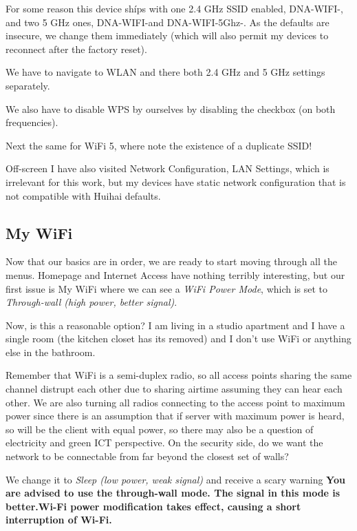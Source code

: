 \documentclass[../wifi-security.tex]{subfiles}
\begin{document}
For some reason this device shíps with one 2.4 GHz SSID enabled, DNA-WIFI-\Name, and two 5 GHz ones, DNA-WIFI-\Name and DNA-WIFI-5Ghz-\Name. As the defaults are insecure, we change them immediately (which will also permit my devices to reconnect after the factory reset).

We have to navigate to WLAN and there both 2.4 GHz and 5 GHz settings separately.

We also have to disable WPS by ourselves by disabling the checkbox (on both frequencies).


Next the same for WiFi 5, where note the existence of a duplicate SSID!

Off-screen I have also visited Network Configuration, LAN Settings, which is irrelevant for this work, but my devices have static network configuration that is not compatible with Huihai defaults.

\subsection{My WiFi}

Now that our basics are in order, we are ready to start moving through all the menus. Homepage and Internet Access have nothing terribly interesting, but our first issue is My WiFi where we can see a \textit{WiFi Power Mode}, which is set to \textit{Through-wall (high power, better signal)}.

Now, is this a reasonable option? I am living in a studio apartment and I have a single room (the kitchen closet has its removed) and I don't use WiFi or anything else in the bathroom.

Remember that WiFi is a semi-duplex radio, so all access points sharing the same channel distrupt each other due to sharing airtime assuming they can hear each other. We are also turning all radios connecting to the access point to maximum power since there is an assumption that if server with maximum power is heard, so will be the client with equal power, so there may also be a question of electricity and green ICT perspective. On the security side, do we want the network to be connectable from far beyond the closest set of walls? \autocite{metistxpower}

We change it to \textit{Sleep (low power, weak signal)} and receive a scary warning \textbf{You are advised to use the through-wall mode. The signal in this mode is better.Wi-Fi power modification takes effect, causing a short interruption of Wi-Fi.}
\end{document}
